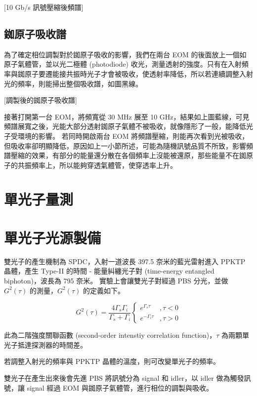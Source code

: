 \documentclass[class=NCU_thesis, crop=false]{standalone}
\begin{document}
[10 Gb/s 訊號壓縮後頻譜]

\subsection{銣原子吸收譜}
為了確定相位調製對於銣原子吸收的影響，我們在兩台 EOM 的後面放上一個如原子氣體管，並以光二極體 (photodiode) 收光，測量透射的強度。只有在入射頻率與銣原子要遷能接共振時光子才會被吸收，使透射率降低，所以若連續調整入射光的頻率，則能掃出整個吸收譜，如圖黑線。

[調製後的銣原子吸收譜]

接著打開第一台 EOM，將頻寬從 30 MHz 展至 10 GHz，結果如上圖藍線，可見頻譜展寬之後，光能大部分透射銣原子氣體不被吸收，就像隱形了一般，能降低光子受環境的影響。
若同時開啟兩台 EOM 將頻譜壓縮，則能再次看到光被吸收，但吸收率卻明顯降低，原因如上一小節所述，可能為隨機訊號品質不所致，影響頻譜壓縮的效果，有部分的能量還分散在各個頻率上沒能被還原，那些能量不在銣原子的共振頻率上，所以能夠穿透氣體管，使穿透率上升。


\section{單光子量測}

\section{單光子光源製備}
雙光子的產生機制為 SPDC，入射一道波長 397.5 奈米的藍光雷射進入 PPKTP 晶體，產生 Type-II 的時間 - 能量糾纏光子對 (time-energy entangled biphoton)，波長為 795 奈米。
實驗上會讓雙光子對經過 PBS 分光，並做 $G^{2}(\tau)$ 的測量，$G^{2}(\tau)$ 的定義如下。

\begin{equation}
    G^{2}(\tau)=\frac{4\Gamma_{s}\Gamma_{i}}{\Gamma_{s}+\Gamma_{i}}\left\{\begin{matrix}
        e^{\Gamma_{s}\tau} & ,\tau<0\\
        e^{-\Gamma_{i}\tau} & ,\tau>0
        \end{matrix}\right.
\end{equation}

此為二階強度關聯函數 (second-order intenstiy correlation function)，$\tau$ 為兩顆單光子抵達探測器的時間差。

若調整入射光的頻率與 PPKTP 晶體的溫度，則可改變單光子的頻率。

雙光子在產生出來後會先進 PBS 將訊號分為 signal 和 idler，以 idler 做為觸發訊號，讓 signal 經過 EOM 與銣原子氣體管，進行相位的調製與吸收。
\end{document}
